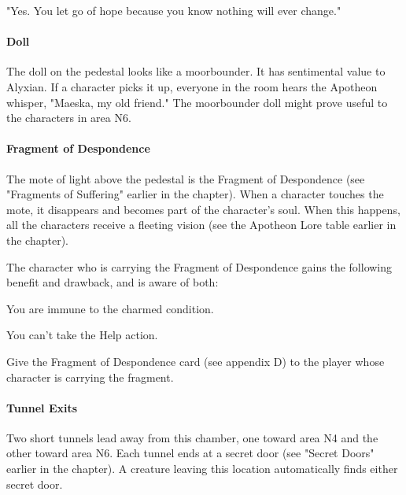 \documentclass[10pt,a4paper,twoside,twocolumn,openany,nodeprecatedcode]{dndbook}
\begin{document}
\begin{DndReadAloud}{}
"Yes. You let go of hope because you know nothing will ever change."

\end{DndReadAloud}

\paragraph{Doll}
The doll on the pedestal looks like a moorbounder. It has sentimental value to Alyxian. If a character picks it up, everyone in the room hears the Apotheon whisper, "Maeska, my old friend." The moorbounder doll might prove useful to the characters in area N6.

\paragraph{Fragment of Despondence}
The mote of light above the pedestal is the Fragment of Despondence (see "Fragments of Suffering" earlier in the chapter). When a character touches the mote, it disappears and becomes part of the character's soul. When this happens, all the characters receive a fleeting vision (see the Apotheon Lore table earlier in the chapter).

The character who is carrying the Fragment of Despondence gains the following benefit and drawback, and is aware of both:

\begin{DndComment}{}

\begin{description}[nolistsep]
\item[Benefit.]
You are immune to the charmed condition.
\item[Drawback.]
You can't take the Help action.
\end{description}

\end{DndComment}

Give the Fragment of Despondence card (see appendix D) to the player whose character is carrying the fragment.

\paragraph{Tunnel Exits}
Two short tunnels lead away from this chamber, one toward area N4 and the other toward area N6. Each tunnel ends at a secret door (see "Secret Doors" earlier in the chapter). A creature leaving this location automatically finds either secret door.
\end{document}
